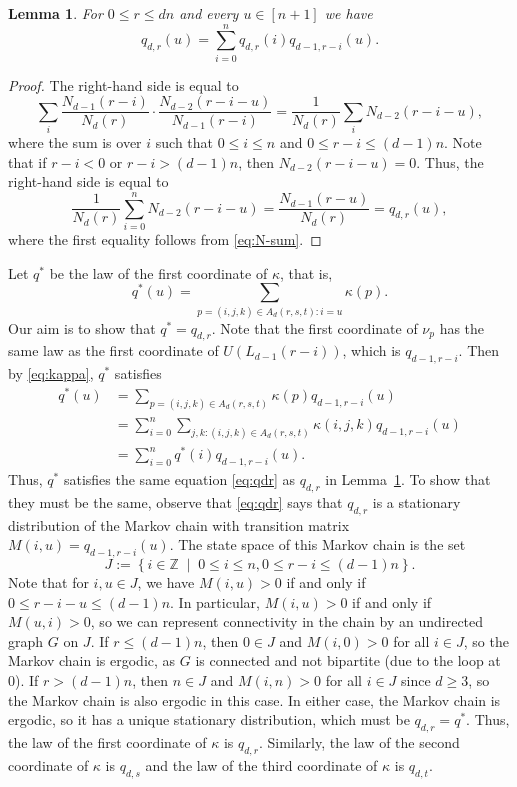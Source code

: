 \documentclass{article}
\newcommand{\setcond}[2]{\left\{ #1 \;\middle\vert\; #2 \right\}}
\newcommand{\ZZ}{\mathbb{Z}}
\newtheorem{lem}[thm]{Lemma}
\theoremstyle{definition}
\begin{document}
\begin{lem} \label{lem:qdr}
    For $0\leq r\leq dn$ and every $u \in [n+1]$ we have
    \begin{equation} \label{eq:qdr}
        q_{d,r}(u) = \sum_{i=0}^n q_{d,r}(i)q_{d-1,r-i}(u).
    \end{equation}
\end{lem}
\begin{proof}
    The right-hand side is equal to
    \[\sum_i \frac{N_{d-1}(r-i)}{N_{d}(r)} \cdot \frac{N_{d-2}(r-i-u)}{N_{d-1}(r-i)} = \frac{1}{N_{d}(r)} \sum_i N_{d-2}(r-i-u),\]
    where the sum is over $i$ such that $0\leq i\leq n$ and $0\leq r-i\leq (d-1)n$. Note that if $r-i<0$ or $r-i>(d-1)n$, then $N_{d-2}(r-i-u)=0$. Thus, the right-hand side is equal to
    \[\frac{1}{N_{d}(r)} \sum_{i=0}^n N_{d-2}(r-i-u) = \frac{N_{d-1}(r-u)}{N_{d}(r)} = q_{d,r}(u),\]
    where the first equality follows from \eqref{eq:N-sum}.
\end{proof}

Let $q^*$ be the law of the first coordinate of $\kappa$, that is,
\[q^*(u) = \sum_{p=(i,j,k)\in A_{d}(r,s,t): i=u} \kappa(p).\]
Our aim is to show that $q^*=q_{d,r}$. Note that the first coordinate of $\nu_p$ has the same law as the first coordinate of $U(L_{d-1}(r-i))$, which is $q_{d-1,r-i}$. Then by \eqref{eq:kappa}, $q^*$ satisfies
\begin{align*}
    q^*(u) &= \sum_{p=(i,j,k)\in A_{d}(r,s,t)} \kappa(p) q_{d-1,r-i}(u)\\
    &= \sum_{i=0}^n \sum_{j,k: (i,j,k)\in A_{d}(r,s,t)} \kappa(i,j,k) q_{d-1,r-i}(u)\\
    &= \sum_{i=0}^n q^*(i)q_{d-1,r-i}(u).
\end{align*}
Thus, $q^*$ satisfies the same equation \eqref{eq:qdr} as $q_{d,r}$ in Lemma~\ref{lem:qdr}. To show that they must be the same, observe that \eqref{eq:qdr} says that $q_{d,r}$ is a stationary distribution of the Markov chain with transition matrix $M(i,u)=q_{d-1,r-i}(u)$. The state space of this Markov chain is the set
\[J:=\setcond{i\in \ZZ}{0\leq i\leq n, 0\leq r-i\leq (d-1)n}.\]
Note that for $i,u\in J$, we have $M(i,u)>0$ if and only if $0\leq r-i-u\leq (d-1)n$.
In particular, $M(i,u)>0$ if and only if $M(u,i)>0$, 
so we can represent connectivity in the chain by an undirected graph $G$ on $J$.
If $r\leq (d-1)n$, then $0\in J$ and $M(i,0)>0$ for all $i\in J$, so the Markov chain is ergodic, as $G$ is connected and not bipartite (due to the loop at $0$). If $r>(d-1)n$, then $n\in J$ and $M(i,n)>0$ for all $i\in J$ since $d\geq 3$, so the Markov chain is also ergodic in this case. In either case, the Markov chain is ergodic, so it has a unique stationary distribution, which must be $q_{d,r}=q^*$. Thus, the law of the first coordinate of $\kappa$ is $q_{d,r}$. Similarly, the law of the second coordinate of $\kappa$ is $q_{d,s}$ and the law of the third coordinate of $\kappa$ is $q_{d,t}$.
\end{document}
